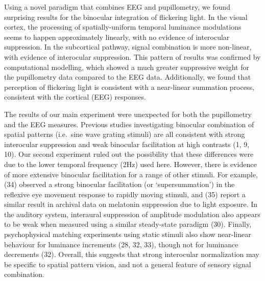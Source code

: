 \documentclass[
]{article}
\begin{document}
Using a novel paradigm that combines EEG and pupillometry, we found surprising results for the binocular integration of flickering light. In the visual cortex, the processing of spatially-uniform temporal luminance modulations seems to happen approximately linearly, with no evidence of interocular suppression. In the subcortical pathway, signal combination is more non-linear, with evidence of interocular suppression. This pattern of results was confirmed by computational modelling, which showed a much greater suppressive weight for the pupillometry data compared to the EEG data. Additionally, we found that perception of flickering light is consistent with a near-linear summation process, consistent with the cortical (EEG) responses.

The results of our main experiment were unexpected for both the pupillometry and the EEG measures. Previous studies investigating binocular combination of spatial patterns (i.e.~sine wave grating stimuli) are all consistent with strong interocular suppression and weak binocular facilitation at high contrasts (1, 9, 10). Our second experiment ruled out the possibility that these differences were due to the lower temporal frequency (2Hz) used here. However, there is evidence of more extensive binocular facilitation for a range of other stimuli. For example, (34) observed a strong binocular facilitation (or `supersummation') in the reflexive eye movement response to rapidly moving stimuli, and (35) report a similar result in archival data on melatonin suppression due to light exposure. In the auditory system, interaural suppression of amplitude modulation also appears to be weak when measured using a similar steady-state paradigm (30). Finally, psychophysical matching experiments using static stimuli also show near-linear behaviour for luminance increments (28, 32, 33), though not for luminance decrements (32). Overall, this suggests that strong interocular normalization may be specific to spatial pattern vision, and not a general feature of sensory signal combination.
\end{document}
